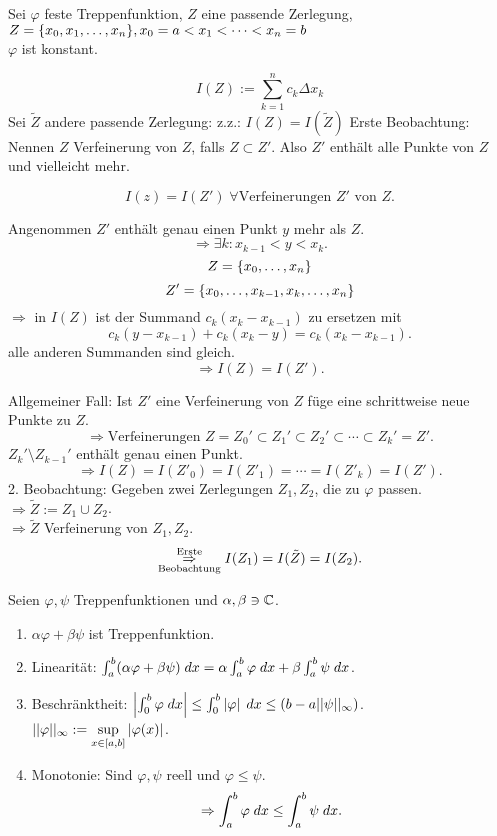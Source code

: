 \documentclass[../ana2.tex]{subfiles}
\begin{document}
\begin{bew}
    Sei \( \varphi \) feste Treppenfunktion, \(Z\) eine passende 
    Zerlegung, \( Z=\set{x_0, x_1,\dots, x_n}, x_0=a<x_1<\dots<x_n=b \) \\
    \( \varphi \) ist konstant.
    
    \[ I(Z) := \sum_{k=1}^n c_k \Delta x_k \]
    Sei \(\tilde{Z}\) andere passende Zerlegung: 
    z.z.: \(I(Z) = I(\tilde{Z})\)
    Erste Beobachtung: Nennen \( Z \) Verfeinerung von \( Z \), 
    falls \( Z \subset Z' \). Also \( Z' \) enthält alle Punkte 
    von \(Z\) und vielleicht mehr.
    \begin{beh}
        \[ I(z) = I(Z') \; \forall \text{Verfeinerungen } Z' \text{ von } Z. \]
    \end{beh}
    \begin{bew}
        Angenommen \(Z'\) enthält genau einen Punkt \(y\) mehr 
        als \(Z\).
        \[ \Rightarrow \exists k : x_{k-1} < y < x_k. \]
        \[ Z = \set{x_0,\ldots,x_n} \]
        \[ Z' = \set{x_0,\ldots,x_{k-1}, x_k,\ldots,x_n} \]
        \(\Rightarrow \) in \(I(Z)\) ist der Summand 
        \( c_k(x_k - x_{k-1}) \) zu ersetzen mit 
        \[ c_k(y - x_{k-1}) + c_k(x_k - y) 
        = c_k(x_k - x_{k-1}). \]
        alle anderen Summanden sind gleich.
        \[ \Rightarrow I(Z) = I(Z'). \]
    \end{bew}
    Allgemeiner Fall: Ist \(Z'\) eine Verfeinerung von \(Z\)
    füge eine schrittweise neue Punkte zu \(Z\).
    \[ \Rightarrow \text{Verfeinerungen } Z = Z_0' 
    \subset Z_1' \subset Z_2' \subset \cdots \subset Z_k' = Z'. \]
    \( Z_k' \setminus Z_{k-1}' \) enthält genau einen Punkt.
    \[ \Rightarrow I(Z) = I(Z'_0) = I(Z'_1) 
    = \cdots = I(Z'_k) = I(Z'). \]
    2. Beobachtung: Gegeben zwei Zerlegungen \(Z_1, Z_2\), die zu 
    \( \varphi \) passen.\\
    \( \Rightarrow \tilde{Z} := Z_1 \cup Z_2 \).\\
    \( \Rightarrow \tilde{Z} \) Verfeinerung von \( Z_1, Z_2 \).
    \[ \overundersett{Erste}{Beobachtung}{\Rightarrow} 
    I(Z_1) = I(\tilde{Z}) = I(Z_2). \]
\end{bew}
\begin{lem}
    Seien \( \varphi, \psi \) Treppenfunktionen und 
    \( \alpha, \beta \ni \C \).
    \begin{enumerate}
        \item \( \alpha \varphi + \beta \psi \) ist Treppenfunktion.
        \item Linearität: \( \integral{(\alpha \varphi + \beta \psi)}{a}{b} 
        = \alpha \integral{\varphi}{a}{b} 
        + \beta \integral{\psi}{a}{b} \).
        \item Beschränktheit: \( \abs{\integral{\varphi}{0}{b}}
        \leq \integral{\abs{\varphi}}{0}{b} \leq (b-a||\psi||_\infty) \). \\
        \( ||\varphi||_\infty 
        := \underset{x \in [a,b]}{\sup} \abs{\varphi(x)} \).
        \item Monotonie: Sind \( \varphi, \psi \) reell und 
        \( \varphi \leq \psi \).
        \[ \Rightarrow \integral{\varphi}{a}{b} 
        \leq \integral{\psi}{a}{b}. \]
    \end{enumerate}    
\end{lem}
\end{document}
